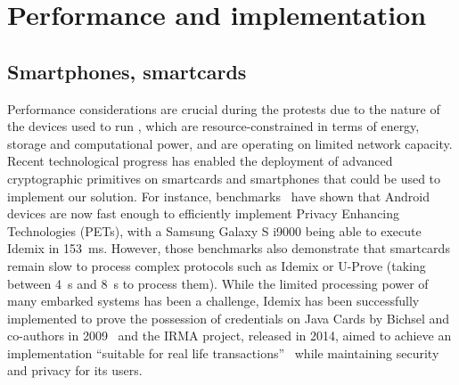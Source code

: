 \section{Performance and implementation}
\label{PerformanceAnalysis}

\subsection{Smartphones, smartcards}
Performance considerations are crucial during the protests due to the nature of the devices used to run \PRIVO, which are resource-constrained in terms of energy, storage and computational power, and are operating on limited network capacity. 
Recent technological progress has enabled the deployment of advanced cryptographic primitives on smartcards and smartphones that could be used to implement our solution.
For instance, benchmarks~\cite{Benchmarking} have shown that Android devices are now fast enough to efficiently implement Privacy Enhancing Technologies (PETs), with a Samsung Galaxy S i9000 being able to execute Idemix in \SI{153}{\milli\second}. 
However, those benchmarks also demonstrate that smartcards remain slow to process complex protocols such as Idemix or U-Prove (taking between \SI{4}{\second} and \SI{8}{\second} to process them). 
While the limited processing power of many embarked systems has been a challenge, Idemix has been successfully implemented to prove the possession of credentials on Java Cards by Bichsel and co-authors in 2009~\cite{Bichsel} and the IRMA project, released in 2014, aimed to achieve an implementation ``suitable for real life transactions''~\cite{IRMA} while maintaining security and privacy for its users. 


